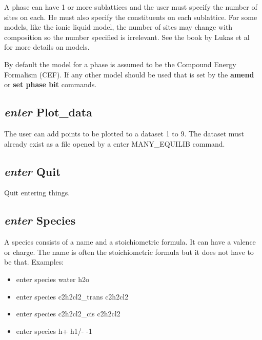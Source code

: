 \documentclass[12pt]{article}
\begin{document}
A phase can have 1 or more sublattices and the user must specify the
number of sites on each.  He must also specify the constituents on
each sublattice.  For some models, like the ionic liquid model, the
number of sites may change with composition so the number specified is
irrelevant.  See the book by Lukas et al~\cite{07Luk} for more details
on models.

By default the model for a phase is assumed to be the Compound Energy
Formalism (CEF).  If any other model should be used that is set by
the {\bf amend} or {\bf set phase bit} commands.

\subsection{{\em enter} Plot\_data}

The user can add points to be plotted to a dataset 1 to 9.  The
dataset must already exist as a file opened by a enter MANY\_EQUILIB
command.

\subsection{{\em enter} Quit}

Quit entering things.

\subsection{{\em enter} Species}

A species consists of a name and a stoichiometric formula.  It can have
a valence or charge.  The name is often the stoichiometric formula
but it does not have to be that.  Examples:

\begin{itemize}
\item enter species water h2o
\item enter species c2h2cl2\_trans c2h2cl2
\item enter species c2h2cl2\_cis c2h2cl2
\item enter species h+ h1/- -1
\end{itemize}
\end{document}
